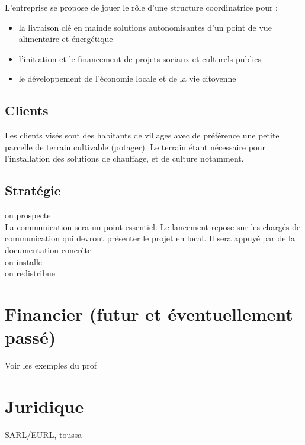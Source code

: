 \documentclass[10pt]{article}
\begin{document}
L'entreprise se propose de jouer le rôle d'une structure coordinatrice pour :
\begin{itemize}
	\item la livraison \og{}clé en main\fg{~}de solutions autonomisantes d'un point de vue alimentaire et énergétique
	\item l'initiation et le financement de projets sociaux et culturels publics
	\item le développement de l'économie locale et de la vie citoyenne
\end{itemize}



\subsection{Clients}
\label{sub:client}
Les clients visés sont des habitants de villages avec de préférence une petite parcelle de terrain cultivable (potager).
Le terrain étant nécessaire pour l'installation des solutions de chauffage, et de culture notamment.

\subsection{Stratégie}
\label{sub:strategie}
on prospecte\\
La communication sera un point essentiel. Le lancement repose sur les chargés de communication qui devront présenter le projet en local. Il sera appuyé par de la documentation concrète \\
on installe\\
on redistribue\\


\section{Financier (futur et éventuellement passé)}
\label{sec:financier}
Voir les exemples du prof

\section{Juridique}
\label{sec:juridique}
SARL/EURL, toussa
\end{document}
